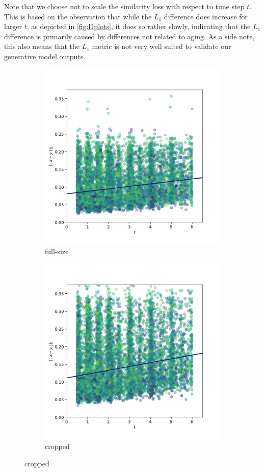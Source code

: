 Note that we choose not to scale the similarity loss with respect to time step $t$. This is based on the observation that while the $L_1$ difference does increase for larger $t$, as depicted in \autoref{fig:l1plots}, it does so rather slowly, indicating that the $L_1$ difference is primarily caused by differences not related to aging. As a side note, this also means that the $L_1$ metric is not very well suited to validate our generative model outputs.

\begin{figure}[h]
	\centering
	\begin{subfigure}{0.48\textwidth}
		\includegraphics[width=0.9\linewidth, trim={10 30 30 30}, clip]{images/l1_diff_plots/brains} 
		\caption{full-size}
	\end{subfigure}
	\begin{subfigure}{0.48\textwidth}
		\includegraphics[width=0.9\linewidth, trim={10 30 30 30}, clip]{images/l1_diff_plots/slice.pdf}
		\caption{cropped}
	\end{subfigure}
	 

\end{figure}
